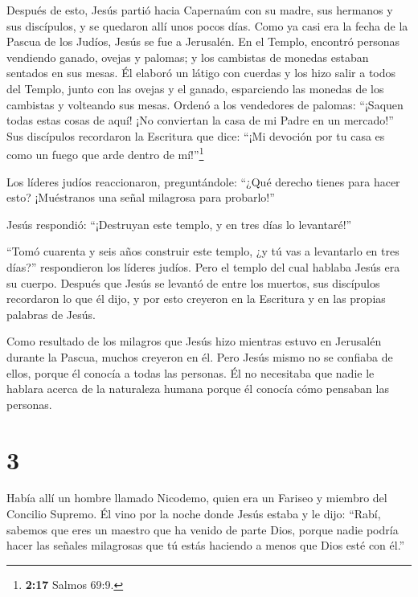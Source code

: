  Después de esto, Jesús partió hacia Capernaúm con su
madre, sus hermanos y sus discípulos, y se quedaron allí unos pocos
días.  Como ya casi era la fecha de la Pascua de los
Judíos, Jesús se fue a Jerusalén.  En el Templo, encontró
personas vendiendo ganado, ovejas y palomas; y los cambistas de monedas
estaban sentados en sus mesas.  Él elaboró un látigo con
cuerdas y los hizo salir a todos del Templo, junto con las ovejas y el
ganado, esparciendo las monedas de los cambistas y volteando sus mesas.
 Ordenó a los vendedores de palomas: ``¡Saquen todas estas
cosas de aquí! ¡No conviertan la casa de mi Padre en un mercado!''
 Sus discípulos recordaron la Escritura que dice: ``¡Mi
devoción por tu casa es como un fuego que arde dentro de
mí!''\footnote{\textbf{2:17} Salmos 69:9.}

 Los líderes judíos reaccionaron, preguntándole: ``¿Qué
derecho tienes para hacer esto? ¡Muéstranos una señal milagrosa para
probarlo!''

 Jesús respondió: ``¡Destruyan este templo, y en tres días
lo levantaré!''

 ``Tomó cuarenta y seis años construir este templo, ¿y tú
vas a levantarlo en tres días?'' respondieron los líderes judíos.
 Pero el templo del cual hablaba Jesús era su cuerpo.
 Después que Jesús se levantó de entre los muertos, sus
discípulos recordaron lo que él dijo, y por esto creyeron en la
Escritura y en las propias palabras de Jesús.

 Como resultado de los milagros que Jesús hizo mientras
estuvo en Jerusalén durante la Pascua, muchos creyeron en él.
 Pero Jesús mismo no se confiaba de ellos, porque él
conocía a todas las personas.  Él no necesitaba que nadie
le hablara acerca de la naturaleza humana porque él conocía cómo
pensaban las personas.

\hypertarget{section-2}{%
\section{3}\label{section-2}}

 Había allí un hombre llamado Nicodemo, quien era un Fariseo
y miembro del Concilio Supremo.  Él vino por la noche donde
Jesús estaba y le dijo: ``Rabí, sabemos que eres un maestro que ha
venido de parte Dios, porque nadie podría hacer las señales milagrosas
que tú estás haciendo a menos que Dios esté con él.''

